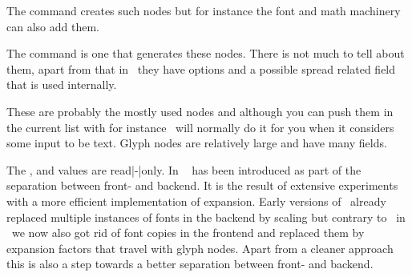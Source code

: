 \stopsubsection

\startsubsection[title={kern}]

The \type {\kern} command creates such nodes but for instance the font and math
machinery can also add them.



\stopsubsection

\startsubsection[title={penalty}]

The \type {\penalty} command is one that generates these nodes. There is not much
to tell about them, apart from that in \LUAMETATEX\ they have options and a
possible spread related  field that is used internally.



\stopsubsection

\startsubsection[title={glyph}]

These are probably the mostly used nodes and although you can push them in the
current list with for instance  \TEX\ will normally do it for you when
it considers some input to be text. Glyph nodes are relatively large and have many
fields.


The ,  and  values are read|-|only.
In \LUATEX\  has been introduced as part of the separation between
front- and backend. It is the result of extensive experiments with a more
efficient implementation of expansion. Early versions of \LUATEX\ already
replaced multiple instances of fonts in the backend by scaling but contrary to
\PDFTEX\ in \LUATEX\ we now also got rid of font copies in the frontend and
replaced them by expansion factors that travel with glyph nodes. Apart from a
cleaner approach this is also a step towards a better separation between front-
and backend.


